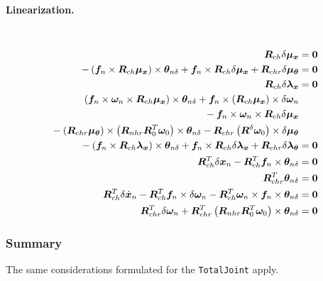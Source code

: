 \documentclass[10pt,fleqn,subeqn]{report}
\newcommand{\T}[1]{\bm{#1}}
\newcommand{\TT}[1]{\bm{#1}}
\begin{document}
\paragraph{Linearization.} \
\begin{subequations}
\begin{align}
	\TT{R}_{ch} \delta\T{\mu}_{\T{x}} &= \T{0} \\
%
	- \plbr{
		\T{f}_n \times \TT{R}_{ch} \T{\mu}_{\T{x}}
	} \times \T{\theta}_{n\delta}
	+ \T{f}_n \times \TT{R}_{ch} \delta\T{\mu}_{\T{x}} + \TT{R}_{chr} \delta\T{\mu}_{\T{\theta}} &= \T{0} \\
%
	\TT{R}_{ch} \delta\T{\lambda}_{\T{x}} &= \T{0} \\
%
	\plbr{
		\T{f}_n \times \T{\omega}_n \times \TT{R}_{ch} \T{\mu}_{\T{x}}
	} \times \T{\theta}_{n\delta} 
	+ \T{f}_n \times \plbr{\TT{R}_{ch} \T{\mu}_{\T{x}}} \times \delta\T{\omega}_n & \nonumber \\
	\mbox{} - \T{f}_n \times \T{\omega}_n \times \TT{R}_{ch} \delta\T{\mu}_{\T{x}} & \nonumber \\
	\mbox{} - \plbr{\TT{R}_{chr} \T{\mu}_{\T{\theta}}}
		\times \plbr{\TT{R}_{nhr} \TT{R}_0^T \T{\omega}_0} \times \T{\theta}_{n\delta} 
	- \TT{R}_{chr} \plbr{\TT{R}^{\delta} \T{\omega}_0} \times \delta\T{\mu}_{\T{\theta}} & \nonumber \\
	\mbox{} - \plbr{\T{f}_n \times \TT{R}_{ch} \T{\lambda}_{\T{x}}} \times \T{\theta}_{n\delta}
	+ \T{f}_n \times \TT{R}_{ch} \delta\T{\lambda}_{\T{x}} + \TT{R}_{chr} \delta\T{\lambda}_{\T{\theta}} &= \T{0} \\
%
	\TT{R}_{ch}^T \delta\T{x}_n - \TT{R}_{ch}^T\T{f}_n\times \T{\theta}_{n\delta} &= \T{0} \\
%
	\TT{R}_{chr}^T \T{\theta}_{n\delta} &= \T{0} \\
%
	\TT{R}_{ch}^T \delta\dot{\T{x}}_n
	- \TT{R}_{ch}^T \T{f}_n \times \delta\T{\omega}_n
	- \TT{R}_{ch}^T \T{\omega}_n \times \T{f}_n \times \T{\theta}_{n\delta} &= \T{0} \\
%
	\TT{R}_{chr}^T \delta\T{\omega}_n
	+ \TT{R}_{chr}^T \plbr{\TT{R}_{nhr} \TT{R}_0^T \T{\omega}_0} \times \T{\theta}_{n\delta} &= \T{0}
\end{align}
\end{subequations}



\subsubsection{Summary}
The same considerations formulated for the \texttt{TotalJoint} apply.
\end{document}
